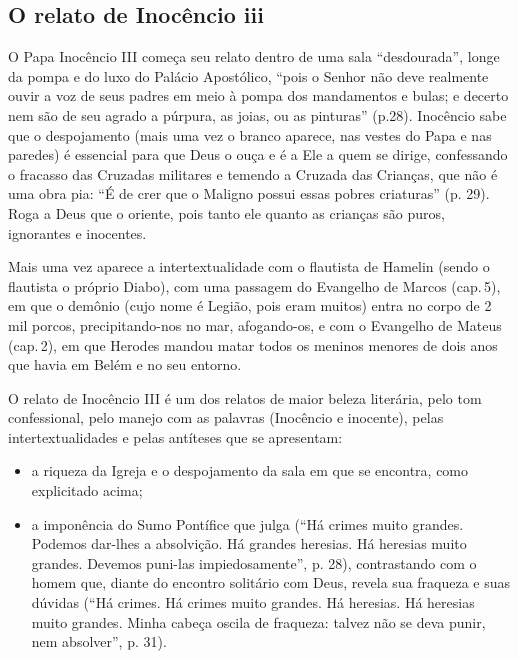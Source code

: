 \documentclass[12pt]{extarticle}
\begin{document}
\subsection{O relato de Inocêncio iii}

O Papa Inocêncio III começa seu relato dentro de uma sala
``desdourada'', longe da pompa e do luxo do Palácio Apostólico, ``pois o
Senhor não deve realmente ouvir a voz de seus padres em meio à pompa dos
mandamentos e bulas; e decerto nem são de seu agrado a púrpura, as
joias, ou as pinturas'' (p.28). Inocêncio sabe que o despojamento (mais
uma vez o branco aparece, nas vestes do Papa e nas paredes) é essencial
para que Deus o ouça e é a Ele a quem se dirige, confessando o fracasso
das Cruzadas militares e temendo a Cruzada das Crianças, que não é uma
obra pia: ``É de crer que o Maligno possui essas pobres criaturas'' (p.
29). Roga a Deus que o oriente, pois tanto ele quanto as crianças são
puros, ignorantes e inocentes.




Mais uma vez aparece a intertextualidade com o flautista de Hamelin
(sendo o flautista o próprio Diabo), com uma passagem do Evangelho de
Marcos (cap.\,5), em que o demônio (cujo nome é Legião, pois eram muitos)
entra no corpo de 2 mil porcos, precipitando-nos no mar, afogando-os, e
com o Evangelho de Mateus (cap.\,2), em que Herodes mandou matar todos os
meninos menores de dois anos que havia em Belém e no seu entorno.

O relato de Inocêncio III é um dos relatos de maior beleza literária,
pelo tom confessional, pelo manejo com as palavras (Inocêncio e
inocente), pelas intertextualidades e pelas antíteses que se
apresentam:

\begin{itemize}
\item a riqueza da Igreja e o despojamento da sala em que se encontra, como
explicitado acima;

\item a imponência do Sumo Pontífice que julga (``Há crimes muito grandes.
Podemos dar-lhes a absolvição. Há grandes heresias. Há heresias muito
grandes. Devemos puni-las impiedosamente'', p. 28), contrastando com o
homem que, diante do encontro solitário com Deus, revela sua fraqueza e
suas dúvidas (``Há crimes. Há crimes muito grandes. Há heresias. Há
heresias muito grandes. Minha cabeça oscila de fraqueza: talvez não se
deva punir, nem absolver'', p. 31).
\end{itemize}
\end{document}
